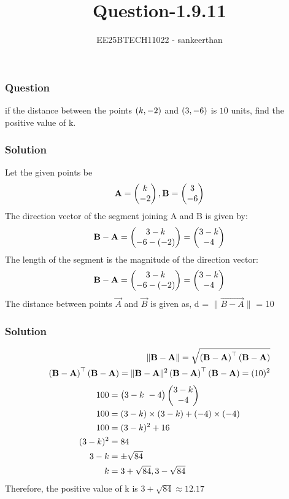\documentclass{beamer}
\title{Question-1.9.11}
\author{EE25BTECH11022 - sankeerthan}
\date{}
\begin{document}
\frame{\titlepage}

\begin{frame}
\frametitle{Question}
if the distance between the points $\left(k,-2\right)$ and $\left(3,-6\right)$ is $10$ units, find the positive value of k.
\end{frame}

\begin{frame}
\frametitle{Solution}
Let the given points be
 \begin{align}
 \mathbf{A} = \begin{pmatrix}k \\ -2\end{pmatrix}, \mathbf{B} = \begin{pmatrix}3 \\ -6\end{pmatrix} 
 \end{align}
The direction vector of the segment joining A and B is given by:
\begin{align}
\mathbf{B} - \mathbf{A} = \begin{pmatrix}3 - k \\ -6 -(-2)\end{pmatrix} = \begin{pmatrix}3-k \\ -4\end{pmatrix} 
\end{align}
The length of the segment is the magnitude of the direction vector:
 \begin{align}
\mathbf{B} - \mathbf{A} = \begin{pmatrix}3 - k \\ -6 -(-2)\end{pmatrix} = \begin{pmatrix}3-k \\ -4\end{pmatrix} 
\end{align}
The distance between points $\vec{A}$ and $\vec{B}$ is given as,
d = $\|\vec{B-A}\|$ = 10
\end{frame}

\begin{frame}
\frametitle{Solution}\begin{align}
\|\mathbf{B-A}\| = \sqrt{\left(\mathbf{B}-\mathbf{A}\right)^\top \left(\mathbf{B}-\mathbf{A}\right)}  \\
\left(\mathbf{B}-\mathbf{A}\right)^\top \left(\mathbf{B}-\mathbf{A}\right) = \|\mathbf{B-A}\|^2
\left(\mathbf{B}-\mathbf{A}\right)^\top \left(\mathbf{B}-\mathbf{A}\right) = (10)^2
\end{align}
\begin{align}
100 &=\begin{pmatrix}3-k  \ -4\end{pmatrix}\begin{pmatrix}3-k \\ -4\end{pmatrix}\\
100 &=(3-k)\times(3-k)+(-4)\times(-4) \\
100 &=(3-k)^2 + 16 \\
(3-k)^2 &= 84 \\
3-k &=\pm \sqrt{84} \\
k &= 3+\sqrt{84} ,3-\sqrt{84}
\end{align}
Therefore, the positive value of k is $3+\sqrt{84} \approx 12.17$

\end{frame}
\end{document}
